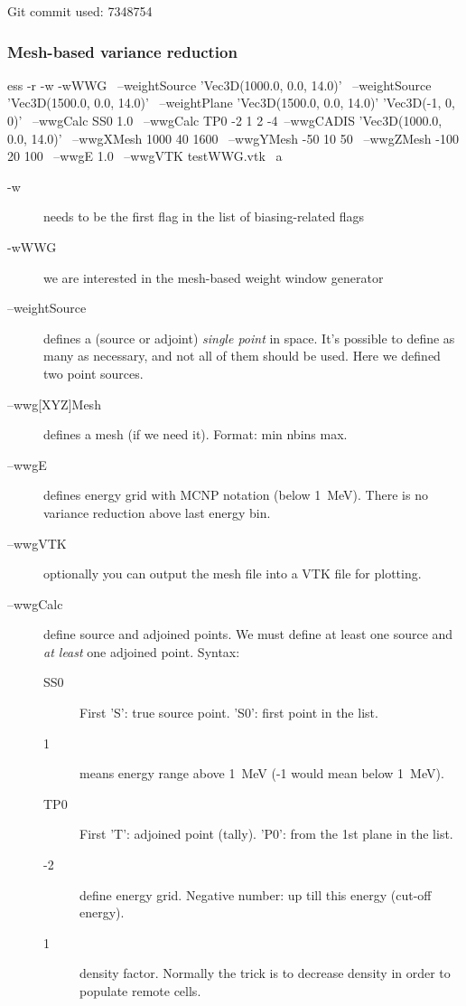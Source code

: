 Git commit used: 7348754

\subsubsection{Mesh-based variance reduction}
\begin{bash}
ess -r -w -wWWG \ 
 --weightSource 'Vec3D(1000.0, 0.0, 14.0)' \
 --weightSource 'Vec3D(1500.0, 0.0, 14.0)' \
 --weightPlane 'Vec3D(1500.0, 0.0, 14.0)' 'Vec3D(-1, 0, 0)' \
 --wwgCalc SS0 1.0 \
 --wwgCalc TP0 -2 1 2 -4\
 --wwgCADIS 'Vec3D(1000.0, 0.0, 14.0)' \
 --wwgXMesh 1000 40 1600 \
 --wwgYMesh -50 10 50 \
 --wwgZMesh -100 20 100 \
 --wwgE 1.0 \
 --wwgVTK testWWG.vtk \
   a
\end{bash}

\begin{description}
\item[-w] needs to be the first flag in the list of biasing-related flags
\item[-wWWG] we are interested in the mesh-based weight window generator
\item[--weightSource] defines a (source or adjoint) {\em single point} in space. It's possible to define as many as necessary, and not all of them should be used.
  Here we defined two point sources.
\item[--wwg{[XYZ]}Mesh] defines a mesh (if we need it). Format: min nbins max.
\item[--wwgE] defines energy grid with MCNP notation (below \SI{1}{\mega\electronvolt}). There is no variance reduction above last energy bin.
\item[--wwgVTK] optionally you can output the mesh file into a VTK file for plotting.
\item[--wwgCalc] define source and adjoined points. We must define at least one source and {\em at least} one adjoined point.
  Syntax:
  \begin{description}
  \item[SS0] First 'S': true source point. 'S0': first point in the list.
  \item[1] means energy range above \SI{1}{\mega\electronvolt} (-1 would mean below \SI{1}{\mega\electronvolt}).
  \item[TP0] First 'T': adjoined point (tally). 'P0': from the 1st plane in the list.
  \item[-2] define energy grid. Negative number: up till this energy (cut-off energy).
  \item[1] density factor. Normally the trick is to decrease density in order to populate remote cells.

\end{description}
\end{description}
